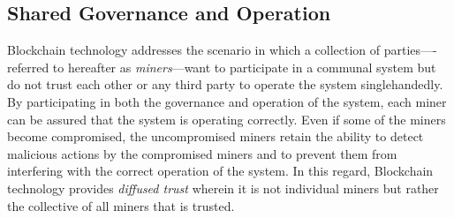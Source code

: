 \subsection{Shared Governance and Operation}
\label{sec:sharedgov}


Blockchain technology addresses the scenario in which a collection of 
parties----referred to hereafter as \emph{miners}---want to participate in a 
communal system but do not trust each other or any third party to operate the 
system singlehandedly.
By participating in both the governance and operation of the system, each miner can be assured that the system is operating correctly.
Even if some of the miners become compromised, the uncompromised miners retain the ability to detect malicious actions by the compromised miners and to prevent them from interfering with the correct operation of the system.
In this regard, Blockchain technology provides \emph{diffused trust} wherein it is not individual miners but rather the collective of all miners that is trusted.


